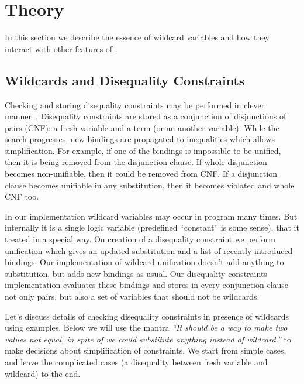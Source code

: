 
\section{Theory}
\label{sec:theory}

In this section we describe the essence of wildcard variables and how they interact with other features of \miniKanren{}.

\subsection{Wildcards and Disequality Constraints}
Checking and storing disequality constraints may be performed in clever manner~\cite{fasterMK}.
Disequality constraints are stored as a conjunction of disjunctions of pairs (CNF): a fresh variable and a term (or an another variable).
While the search  progresses, new bindings are propagated to inequalities which allows simplification.
For example, if one of the bindings is impossible to be unified, then it is being removed from the disjunction clause.
If whole disjunction  becomes non-unifiable, then it could be removed from CNF.
If a disjunction clause becomes unifiable in any substitution, then it becomes violated and whole CNF too.

In our implementation wildcard variables may occur in program many times. But internally it is a single logic variable (predefined ``constant'' is some sense), that it treated in a special way. On creation of a disequality constraint we perform unification which gives an updated substitution and a list of recently introduced bindings. Our implementation of wildcard unification doesn't add anything to substitution, but adds new bindings as usual. Our disequality constraints implementation evaluates these bindings and stores in every conjunction clause not only pairs, but also a set of variables that should not be wildcards.

Let's discuss details of checking disequality constraints in presence of wildcards using examples. Below we will use the mantra \emph{``It should be a way to make two values not equal, in spite of we could substitute anything instead of wildcard.''} to make decisions about simplification of constraints. We start from simple cases, and leave the complicated cases (a disequality between fresh variable and wildcard) to the end.

